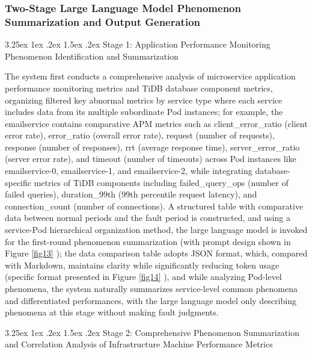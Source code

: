 \documentclass[10pt]{article}
\makeatletter
\let\oldref\ref
\renewcommand{\ref}[1]{%
    \textcolor{blue}{\oldref{#1}}%
}
\renewcommand{\paragraph}{%
    \@startsection{paragraph}{4}{\z@}%
    {3.25ex \@plus1ex \@minus.2ex}%
    {1.5ex \@plus.2ex}%
    {\normalfont\normalsize\itshape}%
}
\makeatother
\begin{document}
\subsubsection{Two-Stage Large Language Model Phenomenon Summarization and Output Generation}

\paragraph{Stage 1: Application Performance Monitoring Phenomenon Identification and Summarization}


The system first conducts a comprehensive analysis of microservice application performance monitoring metrics and TiDB database component metrics, organizing filtered key abnormal metrics by service type where each service includes data from its multiple subordinate Pod instances; for example, the emailservice contains comparative APM metrics such as client\_error\_ratio (client error rate), error\_ratio (overall error rate), request (number of requests), response (number of responses), rrt (average response time), server\_error\_ratio (server error rate), and timeout (number of timeouts) across Pod instances like emailservice-0, emailservice-1, and emailservice-2, while integrating database-specific metrics of TiDB components including failed\_query\_ops (number of failed queries), duration\_99th (99th percentile request latency), and connection\_count (number of connections). A structured table with comparative data between normal periods and the fault period is constructed, and using a service-Pod hierarchical organization method, the large language model is invoked for the first-round phenomenon summarization (with prompt design shown in Figure \ref{fig13}); the data comparison table adopts JSON format, which, compared with Markdown, maintains clarity while significantly reducing token usage (specific format presented in Figure \ref{fig14}), and while analyzing Pod-level phenomena, the system naturally summarizes service-level common phenomena and differentiated performances, with the large language model only describing phenomena at this stage without making fault judgments.

\paragraph{Stage 2: Comprehensive Phenomenon Summarization and Correlation Analysis of Infrastructure Machine Performance Metrics}
\end{document}

